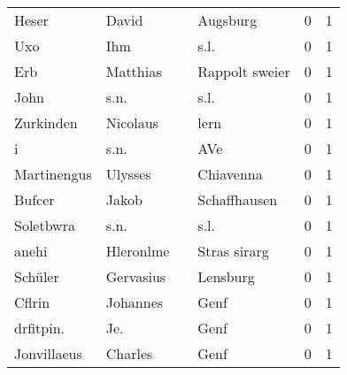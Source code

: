\begin{center}
\begin{tiny}
\begin{longtabu}{llllrr}
                    Heser &                              David &             &                                    Augsburg &          0 &         1 \\
                      Uxo &                                Ihm &             &                                        s.l. &          0 &         1 \\
                      Erb &                           Matthias &             &                              Rappolt sweier &          0 &         1 \\
                     John &                               s.n. &             &                                        s.l. &          0 &         1 \\
                Zurkinden &                           Nicolaus &             &                                        lern &          0 &         1 \\
                        i &                               s.n. &             &                                         AVe &          0 &         1 \\
              Martinengus &                            Ulysses &             &                                   Chiavenna &          0 &         1 \\
                   Bufcer &                              Jakob &             &                                Schaffhausen &          0 &         1 \\
                Soletbwra &                               s.n. &             &                                        s.l. &          0 &         1 \\
                    anehi &                          Hleronlme &             &                                Stras sirarg &          0 &         1 \\
                  Schüler &                          Gervasius &             &                                    Lensburg &          0 &         1 \\
                   Cflrin &                           Johannes &             &                                        Genf &          0 &         1 \\
                drfitpin. &                                Je. &             &                                        Genf &          0 &         1 \\
              Jonvillaeus &                            Charles &             &                                        Genf &          0 &         1 \\

\end{longtabu}
\end{tiny}
\end{center}
